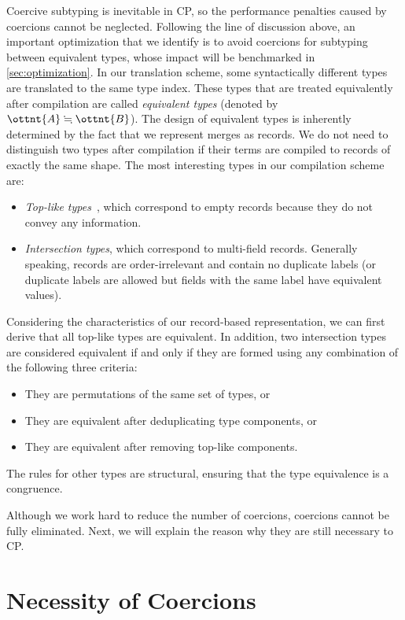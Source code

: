 Coercive subtyping is inevitable in CP, so the performance penalties caused by
coercions cannot be neglected. Following the line of discussion above, an
important optimization that we identify is to avoid coercions for subtyping
between equivalent types, whose impact will be benchmarked in
\autoref{sec:optimization}. In our translation scheme, some syntactically
different types are translated to the same type index. These types that are
treated equivalently after compilation are called \emph{equivalent types}
(denoted by $\ottnt{A}  \fallingdotseq  \ottnt{B}$). The design of equivalent types is inherently determined
by the fact that we represent merges as records. We do not need to distinguish
two types after compilation if their terms are compiled to records of exactly
the same shape. The most interesting types in our compilation scheme are:
\begin{itemize}
\item \emph{Top-like types}~\citep{oliveira2016disjoint}, which correspond to
empty records because they do not convey any information.
\item \emph{Intersection types}, which correspond to multi-field records.
Generally speaking, records are order-irrelevant and contain no duplicate labels
(or duplicate labels are allowed but fields with the same label have equivalent
values).
\end{itemize}
Considering the characteristics of our record-based representation, we can first
derive that all top-like types are equivalent. In addition, two intersection
types are considered equivalent if and only if they are formed using any
combination of the following three criteria:
\begin{itemize}
\item They are permutations of the same set of types, or
\item They are equivalent after deduplicating type components, or
\item They are equivalent after removing top-like components.
\end{itemize}
The rules for other types are structural, ensuring that the type equivalence is
a congruence.

Although we work hard to reduce the number of coercions, coercions cannot be
fully eliminated. Next, we will explain the reason why they are still necessary
to CP.

\section{Necessity of Coercions}

